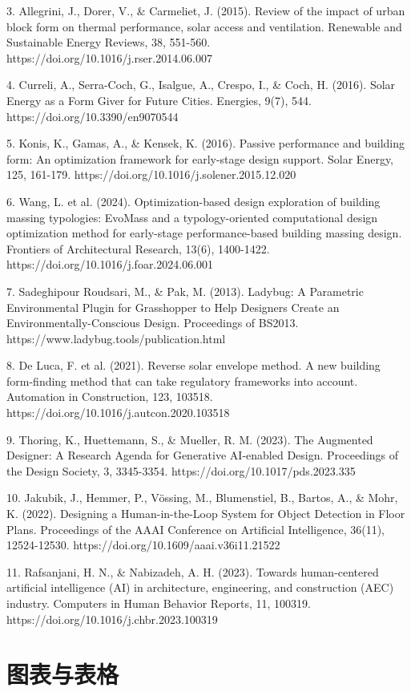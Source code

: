 \documentclass[UTF8,zihao=-4,a4paper]{ctexart}
\begin{document}
3. Allegrini, J., Dorer, V., \& Carmeliet, J. (2015). Review of the impact of urban block form on thermal performance, solar access and ventilation. Renewable and Sustainable Energy Reviews, 38, 551-560. https://doi.org/10.1016/j.rser.2014.06.007

4. Curreli, A., Serra-Coch, G., Isalgue, A., Crespo, I., \& Coch, H. (2016). Solar Energy as a Form Giver for Future Cities. Energies, 9(7), 544. https://doi.org/10.3390/en9070544

5. Konis, K., Gamas, A., \& Kensek, K. (2016). Passive performance and building form: An optimization framework for early-stage design support. Solar Energy, 125, 161-179. https://doi.org/10.1016/j.solener.2015.12.020

6. Wang, L. et al. (2024). Optimization-based design exploration of building massing typologies: EvoMass and a typology-oriented computational design optimization method for early-stage performance-based building massing design. Frontiers of Architectural Research, 13(6), 1400-1422. https://doi.org/10.1016/j.foar.2024.06.001

7. Sadeghipour Roudsari, M., \& Pak, M. (2013). Ladybug: A Parametric Environmental Plugin for Grasshopper to Help Designers Create an Environmentally-Conscious Design. Proceedings of BS2013. https://www.ladybug.tools/publication.html

8. De Luca, F. et al. (2021). Reverse solar envelope method. A new building form-finding method that can take regulatory frameworks into account. Automation in Construction, 123, 103518. https://doi.org/10.1016/j.autcon.2020.103518

9. Thoring, K., Huettemann, S., \& Mueller, R. M. (2023). The Augmented Designer: A Research Agenda for Generative AI-enabled Design. Proceedings of the Design Society, 3, 3345-3354. https://doi.org/10.1017/pds.2023.335

10. Jakubik, J., Hemmer, P., Vössing, M., Blumenstiel, B., Bartos, A., \& Mohr, K. (2022). Designing a Human-in-the-Loop System for Object Detection in Floor Plans. Proceedings of the AAAI Conference on Artificial Intelligence, 36(11), 12524-12530. https://doi.org/10.1609/aaai.v36i11.21522

11. Rafsanjani, H. N., \& Nabizadeh, A. H. (2023). Towards human-centered artificial intelligence (AI) in architecture, engineering, and construction (AEC) industry. Computers in Human Behavior Reports, 11, 100319. https://doi.org/10.1016/j.chbr.2023.100319


\section{图表与表格}
\end{document}
